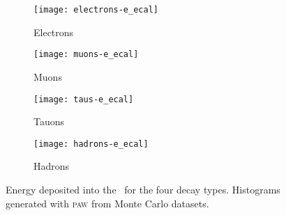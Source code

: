 \begin{figure}
    \centering
    \begin{subfigure}[c]{0.48\linewidth}
        \centering
        \texttt{[image: electrons-e\_ecal]}
        \caption{%
            Electrons
        }
        \label{fig:paw-e_ecal/electrons}
    \end{subfigure}
    \hfill
    \begin{subfigure}[c]{0.48\linewidth}
        \centering
        \texttt{[image: muons-e\_ecal]}
        \caption{%
            Muons
        }
        \label{fig:paw-e_ecal/muons}
    \end{subfigure}

    \vspace{2ex}

    \begin{subfigure}[c]{0.48\linewidth}
        \centering
        \texttt{[image: taus-e\_ecal]}
        \caption{%
            Tauons
        }
        \label{fig:paw-e_ecal/tauons}
    \end{subfigure}
    \hfill
    \begin{subfigure}[c]{0.48\linewidth}
        \centering
        \texttt{[image: hadrons-e\_ecal]}
        \caption{%
            Hadrons
        }
        \label{fig:paw-e_ecal/hadrons}
    \end{subfigure}
    \caption{%
        Energy deposited into the \eecal\ for the four decay types.
        Histograms generated with \textsc{paw} from Monte Carlo datasets.
    }
    \label{fig:paw-e_ecal}
\end{figure}
